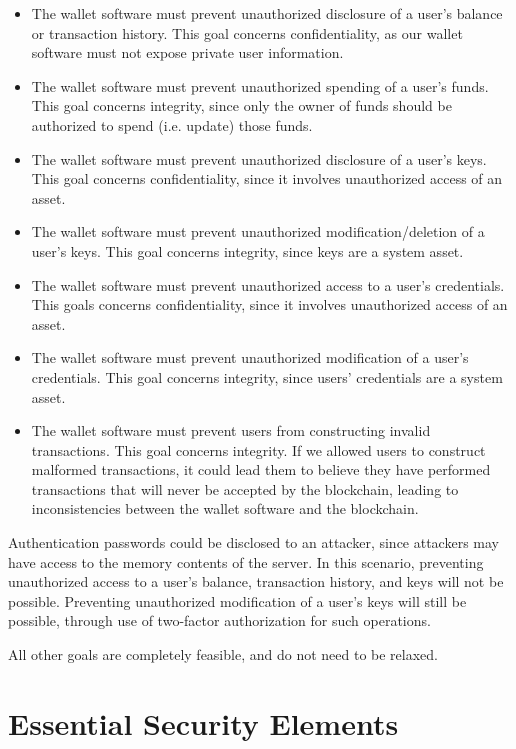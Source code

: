 \documentclass[12pt]{article}
\begin{document}
\begin{itemize}
\item The wallet software must prevent unauthorized disclosure of a user's balance or transaction history. This goal concerns confidentiality, as our wallet software must not expose private user information.
\item The wallet software must prevent unauthorized spending of a user's funds. This goal concerns integrity, since only the owner of funds should be authorized to spend (i.e. update) those funds.
\item The wallet software must prevent unauthorized disclosure of a user's keys. This goal concerns confidentiality, since it involves unauthorized access of an asset.
\item The wallet software must prevent unauthorized modification/deletion of a user's keys. This goal concerns integrity, since keys are a system asset.
\item The wallet software must prevent unauthorized access to a user's credentials. This goals concerns confidentiality, since it involves unauthorized access of an asset.
\item The wallet software must prevent unauthorized modification of a user's credentials. This goal concerns integrity, since users' credentials are a system asset.
\item The wallet software must prevent users from constructing invalid transactions. This goal concerns integrity. If we allowed users to construct malformed transactions, it could lead them to believe they have performed transactions that will never be accepted by the blockchain, leading to inconsistencies between the wallet software and the blockchain.
\end{itemize}

Authentication passwords could be disclosed to an attacker, since attackers may have access to the memory contents of the server. In this scenario, preventing unauthorized access to a user's balance, transaction history, and keys will not be possible. Preventing unauthorized modification of a user's keys will still be possible, through use of two-factor authorization for such operations.

All other goals are completely feasible, and do not need to be relaxed.

\section{Essential Security Elements}
\end{document}
